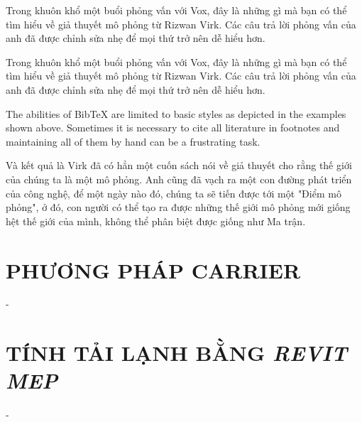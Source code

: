 Trong khuôn khổ\autocite{website} một buổi phỏng vấn với Vox, đây là những gì mà bạn có thể tìm hiểu về giả thuyết mô phỏng từ Rizwan Virk. Các câu trả lời phỏng vấn của anh đã được chỉnh sửa nhẹ để mọi thứ trở nên dễ hiểu hơn.

Trong khuôn khổ một buổi phỏng vấn với Vox, đây là những gì mà bạn có thể tìm hiểu về giả thuyết mô phỏng từ Rizwan Virk. Các câu trả lời phỏng vấn của anh đã được chỉnh sửa nhẹ để mọi thứ trở nên dễ hiểu hơn.

The abilities of BibTeX are limited to basic styles as depicted in the examples shown above. Sometimes it is necessary to cite all literature in footnotes and maintaining all of them by hand can be a frustrating task. 

Và kết quả là Virk đã có hẳn một cuốn sách nói về giả thuyết cho rằng thế giới của chúng ta là một mô phỏng. Anh cũng đã vạch ra một con đường phát triển của công nghệ, để một ngày nào đó, chúng ta sẽ tiến được tới một "Điểm mô phỏng", ở đó, con người có thể tạo ra được những thế giới mô phỏng mới giống hệt thế giới của mình, không thể phân biệt được giống như Ma trận.


\section{PHƯƠNG PHÁP CARRIER}
-

\section{TÍNH TẢI LẠNH BẰNG \emph{REVIT MEP}}
- 
